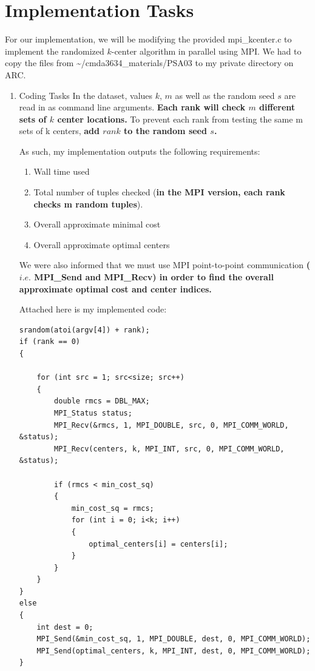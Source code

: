 \documentclass[12pt]{article}
\begin{document}

\section{Implementation Tasks}

For our implementation, we will be modifying the provided mpi\_kcenter.c to implement the randomized $k$-center algorithm in parallel using MPI. 
We had to copy the files from \textasciitilde/cmda3634\_materials/PSA03 to my private directory on ARC.  

\begin{enumerate}
\item Coding Tasks
In the dataset, values $k$, $m$ as well as the random seed $s$ are read in as command line arguments. \textbf{Each rank will check $m$ different sets of $k$ center locations.}
To prevent each rank from testing the same m sets of k centers, \textbf{add $rank$ to the random seed $s$.}

As such, my implementation outputs the following requirements:
    \begin{enumerate}
    \item Wall time used
    \item Total number of tuples checked (\textbf{in the MPI version, each rank checks m random tuples}).
    \item Overall approximate minimal cost
    \item Overall approximate optimal centers
    \end{enumerate}
We were also informed that we must use MPI point-to-point communication 
\textbf{($i.e.$ MPI\_Send and MPI\_Recv) in order to find the overall approximate optimal cost and center indices.}

Attached here is my implemented code:

\begin{verbatim}
srandom(atoi(argv[4]) + rank);
if (rank == 0)
{

    for (int src = 1; src<size; src++)
    {
        double rmcs = DBL_MAX;
        MPI_Status status;
        MPI_Recv(&rmcs, 1, MPI_DOUBLE, src, 0, MPI_COMM_WORLD, &status);
        MPI_Recv(centers, k, MPI_INT, src, 0, MPI_COMM_WORLD, &status);

        if (rmcs < min_cost_sq)
        {
            min_cost_sq = rmcs;
            for (int i = 0; i<k; i++)
            {
                optimal_centers[i] = centers[i];
            }
        }
    }
}
else
{
    int dest = 0;
    MPI_Send(&min_cost_sq, 1, MPI_DOUBLE, dest, 0, MPI_COMM_WORLD);
    MPI_Send(optimal_centers, k, MPI_INT, dest, 0, MPI_COMM_WORLD);
}
\end{verbatim}


\end{enumerate}
\end{document}
